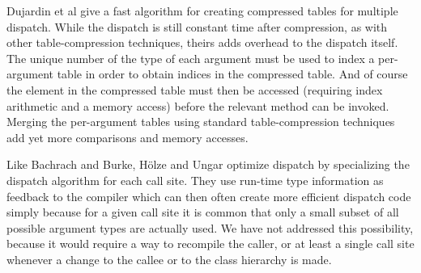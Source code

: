 Dujardin et al \cite{Dujardin:1998:FAC:271510.271521} give a fast
algorithm for creating compressed tables for multiple dispatch.  While
the dispatch is still constant time after compression, as with other
table-compression techniques, theirs adds overhead to the dispatch
itself.  The unique number of the type of each argument must be used
to index a per-argument table in order to obtain indices in the
compressed table.  And of course the element in the compressed table
must then be accessed (requiring index arithmetic and a memory access)
before the relevant method can be invoked.  Merging the per-argument
tables using standard table-compression techniques add yet more
comparisons and memory accesses. 

Like Bachrach and Burke, Hölze and Ungar
\cite{Holzle:1994:ODC:178243.178478} optimize dispatch by specializing
the dispatch algorithm for each call site.  They use run-time type
information as feedback to the compiler which can then often create
more efficient dispatch code simply because for a given call site it
is common that only a small subset of all possible argument types are
actually used.  We have not addressed this possibility, because it
would require a way to recompile the caller, or at least a single call
site whenever a change to the callee or to the class hierarchy is
made.  
